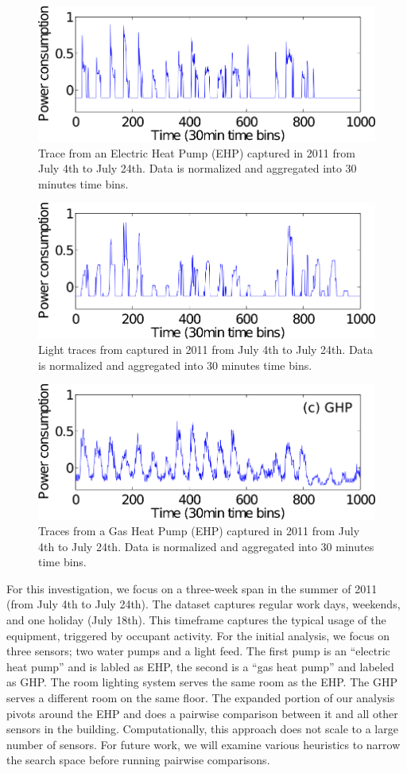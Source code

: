 \begin{figure}[ht!]
\centering
	\includegraphics[width=.4\textwidth]{figs/25.png}
\caption{Trace from an Electric Heat Pump (EHP) captured in 2011 from July 4th to July 24th. Data is 
normalized and aggregated into 30 minutes time bins.}
\label{fig:raw_ehp}
\end{figure}

\begin{figure}[ht!]
\centering
	\includegraphics[width=.4\textwidth]{figs/26.png}
\caption{Light traces from captured in 2011 from July 4th to July 24th. Data is 
normalized and aggregated into 30 minutes time bins.}
\label{fig:raw_light}
\end{figure}

\begin{figure}[ht!]
\centering
	\includegraphics[width=.4\textwidth]{figs/41.png}
\caption{Traces from a Gas Heat Pump (EHP) captured in 2011 from July 4th to July 24th. Data is 
normalized and aggregated into 30 minutes time bins.}
\label{fig:raw_ghp}
\end{figure}



For this investigation, we focus on a three-week span in the summer of 2011 (from July 4th to July 24th).
The dataset captures regular work days, weekends, and one holiday (July 18th).  This timeframe captures
the typical usage of the equipment, triggered by occupant activity.  For the initial
analysis, we focus on three sensors; two water pumps and a light feed.  The first pump is an 
``electric heat pump'' and is labled as EHP, the second  is a ``gas heat pump''
and labeled as GHP.  The room lighting system serves the same room as the EHP.  The GHP
serves a different room on the same floor.  The expanded portion of our analysis pivots around the EHP
and does a pairwise comparison between it and all other sensors in the building.
Computationally, this approach does not scale to a large number of sensors.  For future work, we will
examine various heuristics to narrow the search space before running pairwise comparisons.

